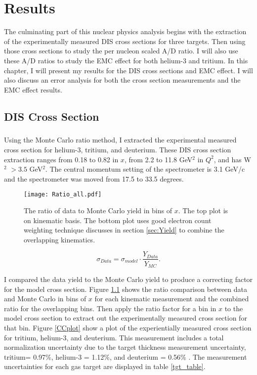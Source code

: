 
\chapter{Results}
The culminating part of this nuclear physics analysis begins with the extraction of the experimentally measured DIS cross sections for three targets. Then using those cross sections to study the per nucleon scaled A/D ratio. I will also use these A/D ratios to study the EMC effect for both helium-3 and tritium. In this chapter, I will present my results for the DIS cross sections and EMC effect. I will also discuss an error analysis for both the cross section measurements and the EMC effect results. 
\section{DIS Cross Section}
\paragraph{}Using the Monte Carlo ratio method, I extracted the experimental measured cross section for helium-3, tritium, and deuterium. These DIS cross section extraction ranges from 0.18 to 0.82 in $x$, from 2.2 to 11.8 GeV$^2$ in $Q^2$, and has W$^2$ $>3.5$ GeV$^2$. The central momentum setting of the spectrometer is 3.1 GeV/c and the spectrometer was moved from 17.5 to 33.5 degrees.
\begin{figure}
	\caption{The ratio of data to Monte Carlo yield in bins of $x$. The top plot is on kinematic basis. The bottom plot uses good electron count weighting technique discusses in section \ref{sec:Yield} to combine the overlapping kinematics.\label{D_MC_COMP}}
	\texttt{[image: Ratio\_all.pdf]}
\end{figure}
\begin{equation}
\sigma_{Data} = \sigma_{model} \cdot \frac{Y_{Data}}{Y_{MC}}. \nonumber
\end{equation} 

I compared the data yield to the Monte Carlo yield to produce a correcting factor for the model cross section. Figure \ref{D_MC_COMP} shows the ratio comparison between data and Monte Carlo in bins of $x$ for each kinematic measurement and the combined ratio for the overlapping bins. Then apply the ratio factor for a bin in $x$ to the model cross section to extract out the experimentally measured cross section for that bin. Figure \ref{CCplot} show a plot of the experientially measured cross section for tritium, helium-3, and deuterium. This measurement includes a total normalization uncertainty due to the target thickness measurement uncertainty, tritium= 0.97\%, helium-3 = 1.12\%, and deuterium = 0.56\% \cite{HATT_eng}. The measurement uncertainties for each gas target are displayed in table \ref{tgt_table}. 

